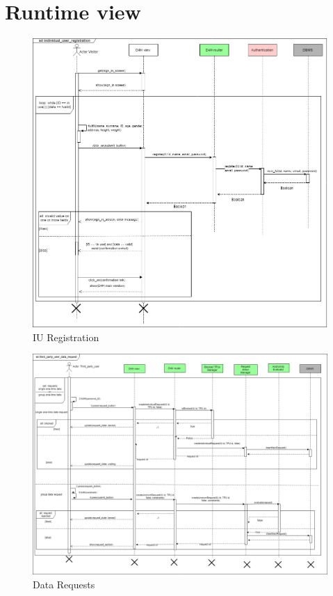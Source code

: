 \section{Runtime view}
\begin{figure}[H]
\caption{IU Registration}
\centering
\includegraphics[width = \textwidth]{sections/architecturalDesign/IUregistration.png}
\end{figure}
\begin{figure}[H]
\caption{Data Requests}
\centering
\includegraphics[width = \textwidth]{sections/architecturalDesign/dataRequests.png}
\end{figure}
